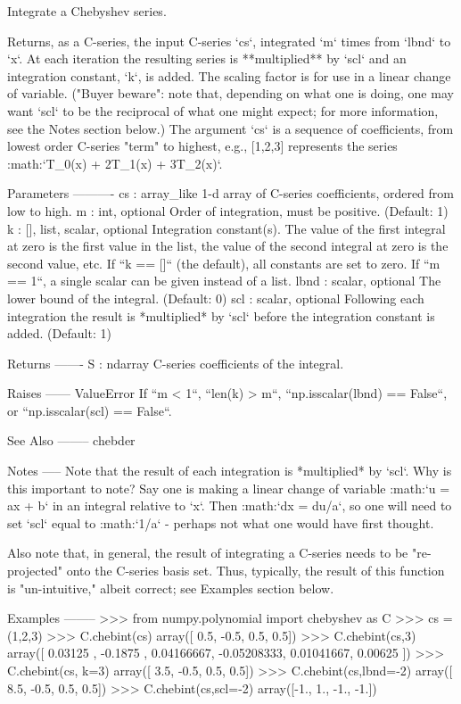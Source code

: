 \begin{DoxyVerb}Integrate a Chebyshev series.

Returns, as a C-series, the input C-series `cs`, integrated `m` times
from `lbnd` to `x`.  At each iteration the resulting series is
**multiplied** by `scl` and an integration constant, `k`, is added.
The scaling factor is for use in a linear change of variable.  ("Buyer
beware": note that, depending on what one is doing, one may want `scl`
to be the reciprocal of what one might expect; for more information,
see the Notes section below.)  The argument `cs` is a sequence of
coefficients, from lowest order C-series "term" to highest, e.g.,
[1,2,3] represents the series :math:`T_0(x) + 2T_1(x) + 3T_2(x)`.

Parameters
----------
cs : array_like
    1-d array of C-series coefficients, ordered from low to high.
m : int, optional
    Order of integration, must be positive. (Default: 1)
k : {[], list, scalar}, optional
    Integration constant(s).  The value of the first integral at zero
    is the first value in the list, the value of the second integral
    at zero is the second value, etc.  If ``k == []`` (the default),
    all constants are set to zero.  If ``m == 1``, a single scalar can
    be given instead of a list.
lbnd : scalar, optional
    The lower bound of the integral. (Default: 0)
scl : scalar, optional
    Following each integration the result is *multiplied* by `scl`
    before the integration constant is added. (Default: 1)

Returns
-------
S : ndarray
    C-series coefficients of the integral.

Raises
------
ValueError
    If ``m < 1``, ``len(k) > m``, ``np.isscalar(lbnd) == False``, or
    ``np.isscalar(scl) == False``.

See Also
--------
chebder

Notes
-----
Note that the result of each integration is *multiplied* by `scl`.
Why is this important to note?  Say one is making a linear change of
variable :math:`u = ax + b` in an integral relative to `x`.  Then
:math:`dx = du/a`, so one will need to set `scl` equal to :math:`1/a`
- perhaps not what one would have first thought.

Also note that, in general, the result of integrating a C-series needs
to be "re-projected" onto the C-series basis set.  Thus, typically,
the result of this function is "un-intuitive," albeit correct; see
Examples section below.

Examples
--------
>>> from numpy.polynomial import chebyshev as C
>>> cs = (1,2,3)
>>> C.chebint(cs)
array([ 0.5, -0.5,  0.5,  0.5])
>>> C.chebint(cs,3)
array([ 0.03125   , -0.1875    ,  0.04166667, -0.05208333,  0.01041667,
        0.00625   ])
>>> C.chebint(cs, k=3)
array([ 3.5, -0.5,  0.5,  0.5])
>>> C.chebint(cs,lbnd=-2)
array([ 8.5, -0.5,  0.5,  0.5])
>>> C.chebint(cs,scl=-2)
array([-1.,  1., -1., -1.])\end{DoxyVerb}
 

